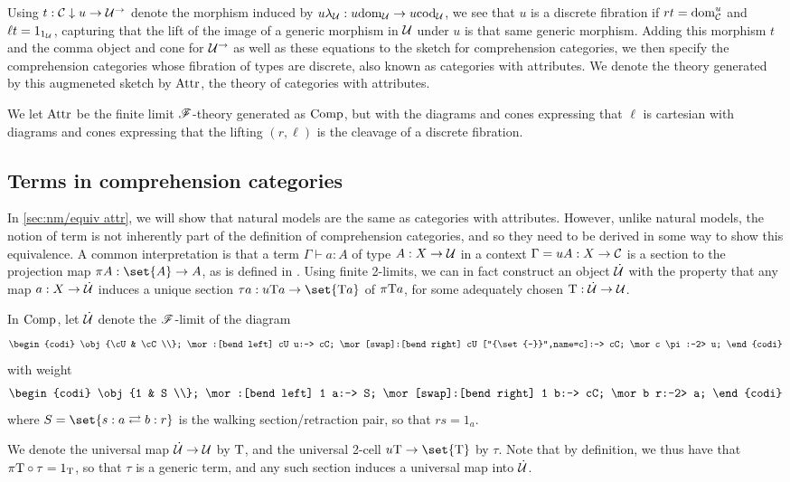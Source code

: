 \documentclass[../thesis.tex]{subfiles}
\begin{document}
Using $t : {\mathcal{C}} \mathrel{\downarrow} u \to {\mathcal{U}}^\to$ denote the morphism induced by $u\lambda_{\mathcal{U}} : u{\mathrm{dom}}_{\mathcal{U}} \to u{\mathrm{cod}}_{\mathcal{U}}$,
we see that $u$ is a discrete fibration if $rt = {\mathrm{dom}}^u_{\mathcal{C}}$ and $\ell t = 1_{1_{\mathcal{U}}}$, capturing that the lift
of the image of a generic morphism in ${\mathcal{U}}$ under $u$ is that same generic morphism. Adding this morphism $t$
and the comma object and cone for ${\mathcal{U}}^\to$ as well as these equations to the sketch for comprehension categories,
we then specify the comprehension categories whose fibration of types are discrete, also known as categories with
attributes. We denote the theory generated by this augmeneted sketch by ${\mathrm{Attr}}$, the theory of categories with
attributes.
\begin{definition}
  We let ${\mathrm{Attr}}$ be the finite limit ${\mathscr{F}}$-theory generated as ${\mathrm{Comp}}$, but with the diagrams and cones expressing
  that $\ell$ is cartesian with diagrams and cones expressing that the lifting $(r,\ell)$ is the cleavage of a discrete
  fibration.
\end{definition}

\subsection{Terms in comprehension categories}\label{subsec:compcat terms}
In \cref{sec:nm/equiv attr}, we will show that natural models are the same as categories with attributes. However,
unlike natural models, the notion of term is not inherently part of the definition of comprehension categories, and so
they need to be derived in some way to show this equivalence. A common interpretation is that a term $\Gamma \vdash a
: A$ of type $A : X \to {\mathcal{U}}$ in a context $\Gamma = uA : X \to {\mathcal{C}}$ is a section to the projection map $\pi A : \set{A}
\to A$, as is defined in \cite{jacobs1993}. Using finite 2-limits, we can in fact construct an object $\dot{{\mathcal{U}}}$ with the
property that any map $a : X \to \dot{{\mathcal{U}}}$ induces a unique section $\tau a : u\typ a \to \set{\typ a}$ of $\pi{{\mathrm{T}}} a$,
for some adequately chosen ${{\mathrm{T}}} : \dot{{\mathcal{U}}} \to {\mathcal{U}}$. 

\begin{definition}
  In ${\mathrm{Comp}}$, let $\dot{{\mathcal{U}}}$ denote the ${\mathscr{F}}$-limit of the diagram
  \[\begin{codi}
    \obj {\cU & \cC \\};
    \mor:[bend left] cU u:-> cC;
    \mor[swap]:[bend right] cU ["{\set{-}}",name=c]:-> cC;
    \mor c \pi:-2> u;
  \end{codi}\]
  with weight
  \[\begin{codi}
    \obj {1 & S \\};
    \mor:[bend left] 1 a:-> S;
    \mor[swap]:[bend right] 1 b:-> cC;
    \mor b r:-2> a;
  \end{codi}\]
  where $S = \set{s : a \rightleftarrows b : r}$ is the walking section/retraction pair, so that $rs = 1_a$.

  We denote the universal map $\dot{{\mathcal{U}}} \to {\mathcal{U}}$ by ${{\mathrm{T}}}$, and the universal 2-cell $u\typ \to \set{\typ}$
  by $\tau$. Note that by definition, we thus have that $\pi {{\mathrm{T}}} \circ \tau = 1_{{\mathrm{T}}}$, so that $\tau$ is
  a generic term, and any such section induces a universal map into $\dot{{\mathcal{U}}}$.
\end{definition}
\end{document}
